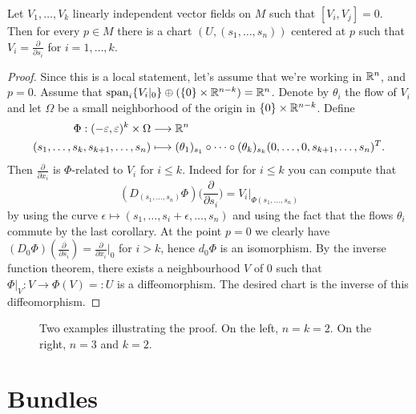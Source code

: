 \begin{prop}\label{prop:usedfol}
    Let $V_1, \ldots, V_k$ linearly independent vector fields on $M$ such that $ [V_i, V_j] = 0$. Then for every  $p \in M$ there is a chart $(U, (s_{1}, \ldots, s_{n}))$ centered at $p$ such that $V_i = \frac{\partial }{\partial s_i} $ for $i = 1, \ldots, k$.
\end{prop}
\begin{proof}
    Since this is a local statement, let's assume that we're working in $\mathbb{R}^{n}$, and $p = 0$.
    Assume that $\operatorname{span}_i \{V_i|_0\} \oplus (\{0\} \times \mathbb{R}^{n-k}) = \mathbb{R}^n$.
    Denote by $\theta_i$ the flow of $V_i$ and let $\Omega$ be a small neighborhood of the origin in $\{0\} \times \mathbb{R}^{n-k}$.
    Define  
    \begin{align*}
        \Phi: (-\varepsilon, \varepsilon)^{k} \times \Omega &\longrightarrow  \mathbb{R}^n\\
        (s_1, \ldots, s_k, s_{k+1}, \ldots, s_n)&\longmapsto
        (\theta_1)_{s_1}  \circ  \cdots  \circ 
        (\theta_k)_{s_k}
        (0, \ldots, 0, s_{k+1},\ldots, s_n)^{T}
    .\end{align*}
    Then $\frac{\partial }{\partial x_i} $ is $\Phi$-related to $V_i$ for $i \le  k$.
   Indeed for for $i \le  k$ you can compute that
$$(D_{(s_1,\dots,s_n)}\Phi)\Big(  \frac{\partial }{\partial s_i}\Big)=V_i|_{\Phi(s_1,\dots,s_n)}$$
   by using the curve $\epsilon\mapsto (s_1,\dots,s_i+\epsilon,\dots,s_n)$ and using the fact that the flows $\theta_i$ commute by the last corollary. At the point $p=0$ we clearly have
$(D_{0}\Phi)(  \frac{\partial }{\partial s_i}) =  \frac{\partial }{\partial x_i}|_0$
for $i>k$, hence $d_0 \Phi$ is an isomorphism.
    By the inverse function theorem, there exists a neighbourhood $V$ of $0$ such that $\Phi|_V: V \to  \Phi(V)=:U$ is a diffeomorphism. The desired chart is the inverse of this diffeomorphism.
\end{proof}
\begin{figure}[H]
    \centering
    \caption{
        Two examples illustrating the proof.
        On the left, $n = k = 2$.
        On the right, $n = 3$ and  $k = 2$.
    }
    \label{fig:canonical-form-of-commuting-vector-fields}
\end{figure}



\setcounter{chapter}{3}
\chapter{Bundles}

